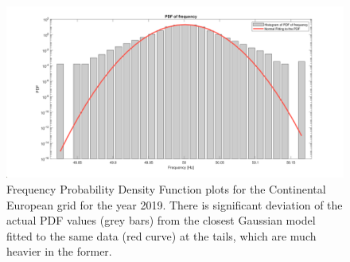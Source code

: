 \begin{figure}[!ht]
	\includegraphics[scale=0.25]{../figures/pdf/pdf_frequency_continental_europe_2019}
	\caption{Frequency Probability Density Function plots for the Continental European grid for the year 2019. There is significant deviation of the actual PDF values (grey bars) from the closest Gaussian model fitted to the same data (red curve) at the tails, which are much heavier in the former.	}
\end{figure}

